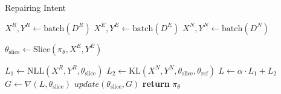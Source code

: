 \begin{algorithm}
\caption{Repairing Intent}
\label{algo:repair}
\begin{algorithmic}[1]
  \Repeat
    \State $X^R, Y^R \gets \text{batch}(D^R)$\label{algorp:1}
    \State $X^E, Y^E \gets \text{batch}(D^E)$\label{algorp:2}
    \State $X^N, Y^N \gets \text{batch}(D^N)$\label{algorp:3}

    \State $\theta_\text{slice} \gets \text{Slice}(\pi_\theta,X^E, Y^E)$\label{algorp:4}

    \State $L_1 \gets \text{NLL}(X^R, Y^R, \theta_{\text{slice}})$\label{algorp:5}
    \State $L_2 \gets \text{KL}(X^N, Y^N, \theta_{\text{slice}}, \theta_{\text{ref}})$\label{algorp:6}
    \State $L \gets \alpha \cdot L_1 + L_2$\label{algorp:7}
    \State $G \gets \nabla(L, \theta_\text{slice})$\label{algorp:8}
    \State $update(\theta_{\text{slice}}, G)$\label{algorp:9}
  \label{algorp:10}
  \State \textbf{return} $\pi_{\theta}$\label{algorp:11}
\EndFunction
\end{algorithmic}

\end{algorithm}
